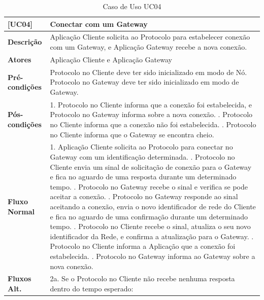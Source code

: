 \begin{longtable}{|p{2.65cm}|p{13cm}|}
    \caption{Caso de Uso UC04}\label{tab:use-cases04} \\
    \hline
    \textbf{[UC04]} & Conectar com um Gateway \\
    \hline
    \textbf{Descrição} & Aplicação Cliente solicita ao Protocolo para estabelecer conexão com um Gateway, e Aplicação Gateway recebe a nova conexão. \\
    \hline
    \textbf{Atores} & Aplicação Cliente e Aplicação Gateway \\
    \hline
    \textbf{Pré-condições} & Protocolo no Cliente deve ter sido inicializado em modo de Nó. \newline
    Protocolo no Gateway deve ter sido inicializado em modo de Gateway. \\
    \hline
    \textbf{Pós-condições} & 1. Protocolo no Cliente informa que a conexão foi estabelecida, e Protocolo no Gateway informa sobre a nova conexão. \newline
    2. Protocolo no Cliente informa que a conexão não foi estabelecida. \newline
    3. Protocolo no Cliente informa que o Gateway se encontra cheio. \\
    \hline
    \textbf{Fluxo Normal} & 1. Aplicação Cliente solicita ao Protocolo para conectar no Gateway com um identificação determinada. \newline
    2. Protocolo no Cliente envia um sinal de solicitação de conexão para o Gateway e fica no aguardo de uma resposta durante um determinado tempo. \newline
    3. Protocolo no Gateway recebe o sinal e verifica se pode aceitar a conexão. \newline
    4. Protocolo no Gateway responde ao sinal aceitando a conexão, envia o novo identificador de rede do Cliente e fica no aguardo de uma confirmação durante um determinado tempo. \newline
    5. Protocolo no Cliente recebe o sinal, atualiza o seu novo identificador da Rede, e confirma a atualização para o Gateway. \newline
    6. Protocolo no Cliente informa a Aplicação que a conexão foi estabelecida. \newline
    7. Protocolo no Gateway informa ao Gateway sobre a nova conexão. \\
    \hline
    \textbf{Fluxos Alt.} & 2a. Se o Protocolo no Cliente não recebe nenhuma resposta dentro do tempo esperado: \newline

\end{longtable}
